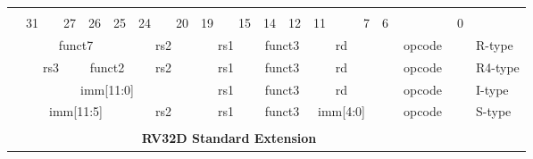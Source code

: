 \newpage

\begin{table}[p]
\begin{small}
\begin{center}
    \begin{tabular} {p{0.002in}p{0.002in}p{0.002in}p{0.002in}p{0.002in}p{0.002in}p{0.002in}p{0.002in}p{0.002in}p{0.002in}p{0.002in}p{0.002in}p{0.002in}p{0.002in}p{0.002in}p{0.002in}p{0.002in}p{0.002in}p{0.002in}p{0.002in}p{0.002in}p{0.002in}p{0.002in}p{0.002in}p{0.002in}p{0.002in}p{0.002in}p{0.002in}p{0.002in}p{0.002in}p{0.002in}p{0.002in}p{0.002in}l}
    & & & & & & & & & & & & & & & & & & & & & & & & & & & & & & & & \\

            &

    \multicolumn{3}{l}{31} &
    \multicolumn{2}{r}{27} &
    \multicolumn{1}{c}{26} &
    \multicolumn{1}{r}{25} &
    \multicolumn{3}{l}{24} &
    \multicolumn{2}{r}{20} &
    \multicolumn{3}{l}{19} &
    \multicolumn{2}{r}{15} &
    \multicolumn{2}{l}{14} &
    \multicolumn{1}{r}{12} &
    \multicolumn{4}{l}{11} &
    \multicolumn{1}{r}{7} &
    \multicolumn{6}{l}{6} &
    \multicolumn{1}{r}{0} \\
    \cline{2-33}
&


\multicolumn{7}{|c|}{funct7} &
\multicolumn{5}{c|}{rs2} &
\multicolumn{5}{c|}{rs1} &
\multicolumn{3}{c|}{funct3} &
\multicolumn{5}{c|}{rd} &
\multicolumn{7}{|c|}{opcode} & R-type \\
\cline{2-33}
&

\multicolumn{5}{|c|}{rs3} &
\multicolumn{2}{c|}{funct2} &
\multicolumn{5}{c|}{rs2} &
\multicolumn{5}{c|}{rs1} &
\multicolumn{3}{c|}{funct3} &
\multicolumn{5}{c|}{rd} &
\multicolumn{7}{|c|}{opcode} & R4-type \\
\cline{2-33}
&

\multicolumn{12}{|c|}{imm[11:0]} &
\multicolumn{5}{c|}{rs1} &
\multicolumn{3}{c|}{funct3} &
\multicolumn{5}{c|}{rd} &
\multicolumn{7}{|c|}{opcode} & I-type \\
\cline{2-33}
&

\multicolumn{7}{|c|}{imm[11:5]} &
\multicolumn{5}{c|}{rs2} &
\multicolumn{5}{c|}{rs1} &
\multicolumn{3}{c|}{funct3} &
\multicolumn{5}{c|}{imm[4:0]} &
\multicolumn{7}{|c|}{opcode} & S-type \\
\cline{2-33}
&




\multicolumn{32}{c}{} & \\
\multicolumn{32}{c}{\bfseries RV32D Standard Extension } & \\
\cline{2-33}


\end{tabular}
\end{center}
\end{small}
\end{table}
